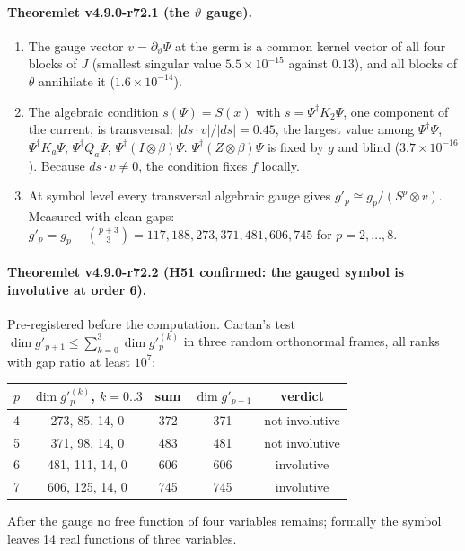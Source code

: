 \paragraph{Theoremlet v4.9.0-r72.1 (the \(\vartheta\) gauge).}
\begin{enumerate}[leftmargin=2em]
\item[(a)] The gauge vector \(v=\partial_\vartheta\Psi\) at the germ is a common kernel vector of all four blocks of \(J\)
(smallest singular value \(5.5\times10^{-15}\) against \(0.13\)), and all blocks of \(\theta\) annihilate it
(\(1.6\times10^{-14}\)).
\item[(b)] The algebraic condition \(s(\Psi)=S(x)\) with \(s=\Psi^\dagger K_2\Psi\), one component of the current, is
transversal: \(|ds\cdot v|/|ds|=0.45\), the largest value among \(\Psi^\dagger\Psi\), \(\Psi^\dagger K_a\Psi\),
\(\Psi^\dagger Q_a\Psi\), \(\Psi^\dagger(I\otimes\beta)\Psi\).  \(\Psi^\dagger(Z\otimes\beta)\Psi\) is fixed by \(g\) and blind
(\(3.7\times10^{-16}\)).  Because \(ds\cdot v\neq0\), the condition fixes \(f\) locally.
\item[(c)] At symbol level every transversal algebraic gauge gives \(g'_p\cong g_p/(S^p\otimes v)\).  Measured with clean
gaps: \(g'_p=g_p-\binom{p+3}{3}=117,188,273,371,481,606,745\) for \(p=2,\dots,8\).
\end{enumerate}

\paragraph{Theoremlet v4.9.0-r72.2 (H51 confirmed: the gauged symbol is involutive at order 6).}
Pre-registered before the computation.  Cartan's test \(\dim g'_{p+1}\le\sum_{k=0}^{3}\dim g'^{(k)}_p\) in three random
orthonormal frames, all ranks with gap ratio at least \(10^7\):
\begin{center}
\small
\begin{tabular}{@{}ccccc@{}}
\toprule
\(p\) & \(\dim g'^{(k)}_p\), \(k=0..3\) & sum & \(\dim g'_{p+1}\) & verdict\\
\midrule
4 & 273, 85, 14, 0 & 372 & 371 & not involutive\\
5 & 371, 98, 14, 0 & 483 & 481 & not involutive\\
6 & 481, 111, 14, 0 & 606 & 606 & involutive\\
7 & 606, 125, 14, 0 & 745 & 745 & involutive\\
\bottomrule
\end{tabular}
\end{center}
After the gauge no free function of four variables remains; formally the symbol leaves 14 real functions of three variables.


